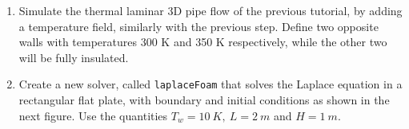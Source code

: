 \documentclass{article}
\begin{document}
\begin{enumerate}
	
	\item Simulate the thermal laminar 3D pipe flow of the previous tutorial, by adding a temperature field, similarly with the previous step. Define two opposite walls with temperatures 300 K and 350 K respectively, while the other two will be fully insulated.
	
	\item Create a new solver, called {\tt laplaceFoam} that solves the Laplace equation in a rectangular flat plate, with boundary and initial conditions as shown in the next figure. Use the quantities $T_w=10~K,~L=2~m$ and $H=1~m$.
	
\end{enumerate}

%	
%	
%	
%	
%	
%
\end{document}
